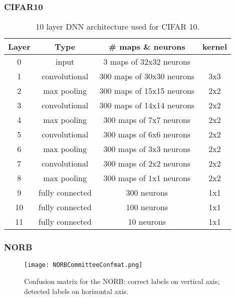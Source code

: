 \documentclass[a4paper]{article}
\begin{document}
\subsubsection{CIFAR10}
\begin{table}[h!]
\caption{10 layer DNN architecture used for CIFAR 10.} 
\small
\begin{center}
\begin{tabular}{c|c|c|c}
Layer		&	Type			&	\# maps \& neurons			&	kernel	\\
\hline
0		&	input			&	3 maps of 32x32 neurons		&			\\
1		&	convolutional	&	300 maps of 30x30 neurons		&	3x3		\\
2		&	max pooling	&	300 maps of 15x15 neurons		&	2x2		\\
3		&	convolutional	&	300 maps of 14x14 neurons		&	2x2		\\
4		&	max pooling	&	300 maps of 7x7 neurons		&	2x2		\\
5		&	convolutional	&	300 maps of 6x6 neurons		&	2x2		\\
6		&	max pooling	&	300 maps of 3x3 neurons		&	2x2		\\
7		&	convolutional	&	300 maps of 2x2 neurons		&	2x2		\\
8		&	max pooling	&	300 maps of 1x1 neurons		&	2x2		\\
9		&	fully connected	&	300 neurons				&	1x1		\\
10		&	fully connected	&	100 neurons				&	1x1		\\
11		&	fully connected	&	10 neurons				&	1x1		\\
\end{tabular}
\label{tab:netCIFAR10}
\end{center}
\end{table}

\subsubsection{NORB}

\begin{figure}[ht!]
\hfill
\begin{center}
\texttt{[image: NORBCommitteeConfmat.png]}
\end{center}
\caption{Confusion matrix for the NORB: correct labels on vertical axis; detected labels on horizontal axis.}
\label{Fig:confMatNORB}
\end{figure}
\end{document}
